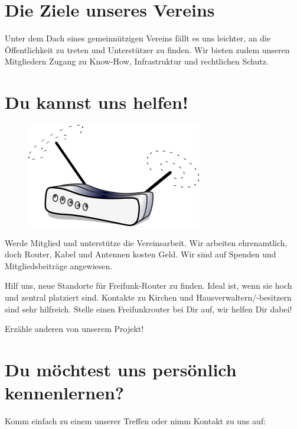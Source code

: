 \documentclass[10pt]{scrartcl}
\begin{document}
\newpage
{}

\section{\normalsize Die Ziele unseres Vereins}
Unter dem Dach eines gemeinnützigen Vereins fällt es uns leichter, an die Öffentlichkeit zu treten und Unterstützer zu finden. Wir bieten zudem unseren Mitgliedern Zugang zu Know-How, Infrastruktur und rechtlichen Schutz.

\section{\normalsize Du kannst uns helfen!}
\begin{figure}
\includegraphics[scale=0.4]{Router}
\end{figure}
Werde Mitglied und unterstütze die Vereinsarbeit. Wir arbeiten ehrenamtlich, doch Router, Kabel und Antennen kosten Geld. Wir sind auf Spenden und Mitgliedsbeiträge angewiesen.

Hilf uns, neue Standorte für Freifunk-Router zu finden. Ideal ist, wenn sie hoch und zentral platziert sind. Kontakte zu Kirchen und Hausverwaltern/-besitzern sind sehr hilfreich. Stelle einen Freifunkrouter bei Dir auf, wir helfen Dir dabei!

Erzähle anderen von unserem Projekt!

\section{\normalsize Du möchtest uns persönlich kennenlernen?}
Komm einfach zu einem unserer Treffen oder nimm Kontakt zu uns auf:
\end{document}
